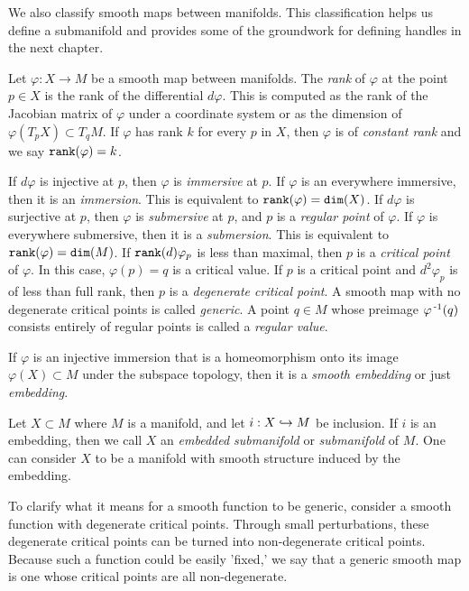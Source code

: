 We also classify smooth maps between manifolds.
This classification helps us define a submanifold and provides some of the groundwork for defining handles in the next chapter.

\begin{defn}[Embedding]
	Let $\varphi:X\to M$ be a smooth map between manifolds.
	The \emph{rank} of $\varphi$ at the point $p\in X$ is the rank of the differential $d\varphi$.
	This is computed as the rank of the Jacobian matrix of $\varphi$ under a coordinate system or as the dimension of $\varphi(T_p X)\subset T_q M$.
	If $\varphi$ has rank $k$ for every $p$ in $X$, then $\varphi$ is of \emph{constant rank} and we say $\texttt{rank}(\varphi)=k$.
	 
	If $d\varphi$ is injective at $p$, then $\varphi$ is \emph{immersive} at $p$.
	If $\varphi$ is an everywhere immersive, then it is an \emph{immersion}.
	This is equivalent to $\texttt{rank}(\varphi)=\texttt{dim}(X)$.
	If $d\varphi$ is surjective at $p$, then $\varphi$ is \emph{submersive} at $p$, and $p$ is a \emph{regular point} of $\varphi$.
	If $\varphi$ is everywhere submersive, then it is a \emph{submersion}.
	This is equivalent to $\texttt{rank}(\varphi)=\texttt{dim}(M)$.
	If $\texttt{rank}(d)\varphi_p$ is less than maximal, then $p$ is a \emph{critical point} of $\varphi$.
	In this case, $\varphi(p)=q$ is a critical value.
	If $p$ is a critical point and $d^2\varphi_p$ is of less than full rank, then $p$ is a \emph{degenerate critical point}.
	A smooth map with no degenerate critical points is called \emph{generic}.
	A point $q\in M$ whose preimage $\varphi^{\,\text{-}1}(q)$ consists entirely of regular points is called a \emph{regular value}.
	
	If $\varphi$ is an injective immersion that is a homeomorphism onto its image $\varphi(X)\subset M$ under the subspace topology, then it is a \emph{smooth embedding} or just \emph{embedding}.
	
	Let $X\subset M$ where $M$ is a manifold, and let $i:X\hookrightarrow M$ be inclusion.
	If $i$ is an embedding, then we call $X$ an \emph{embedded submanifold} or \emph{submanifold} of $M$.
	One can consider $X$ to be a manifold with smooth structure induced by the embedding.
\end{defn}

To clarify what it means for a smooth function to be generic, consider a smooth function with degenerate critical points.
Through small perturbations, these degenerate critical points can be turned into non-degenerate critical points.
Because such a function could be easily 'fixed,' we say that a generic smooth map is one whose critical points are all non-degenerate.

